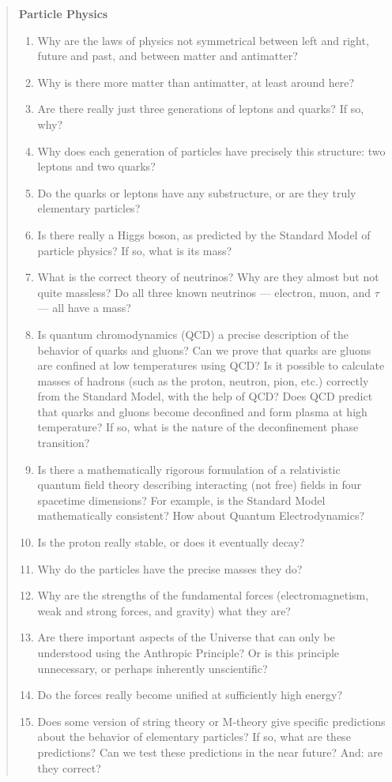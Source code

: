 \documentclass{article}
\begin{document}
\begin{quote}
\textbf{Particle Physics}

\begin{enumerate}
\def\labelenumi{\arabic{enumi})}
\item
  Why are the laws of physics not symmetrical between left and right,
  future and past, and between matter and antimatter?
\item
  Why is there more matter than antimatter, at least around here?
\item
  Are there really just three generations of leptons and quarks? If so,
  why?
\item
  Why does each generation of particles have precisely this structure:
  two leptons and two quarks?
\item
  Do the quarks or leptons have any substructure, or are they truly
  elementary particles?
\item
  Is there really a Higgs boson, as predicted by the Standard Model of
  particle physics? If so, what is its mass?
\item
  What is the correct theory of neutrinos? Why are they almost but not
  quite massless? Do all three known neutrinos --- electron, muon, and
  \(\tau\) --- all have a mass?
\item
  Is quantum chromodynamics (QCD) a precise description of the behavior
  of quarks and gluons? Can we prove that quarks are gluons are confined
  at low temperatures using QCD? Is it possible to calculate masses of
  hadrons (such as the proton, neutron, pion, etc.) correctly from the
  Standard Model, with the help of QCD? Does QCD predict that quarks and
  gluons become deconfined and form plasma at high temperature? If so,
  what is the nature of the deconfinement phase transition?
\item
  Is there a mathematically rigorous formulation of a relativistic
  quantum field theory describing interacting (not free) fields in four
  spacetime dimensions? For example, is the Standard Model
  mathematically consistent? How about Quantum Electrodynamics?
\item
  Is the proton really stable, or does it eventually decay?
\item
  Why do the particles have the precise masses they do?
\item
  Why are the strengths of the fundamental forces (electromagnetism,
  weak and strong forces, and gravity) what they are?
\item
  Are there important aspects of the Universe that can only be
  understood using the Anthropic Principle? Or is this principle
  unnecessary, or perhaps inherently unscientific?
\item
  Do the forces really become unified at sufficiently high energy?
\item
  Does some version of string theory or M-theory give specific
  predictions about the behavior of elementary particles? If so, what
  are these predictions? Can we test these predictions in the near
  future? And: are they correct?
\end{enumerate}


\end{quote}
\end{document}
